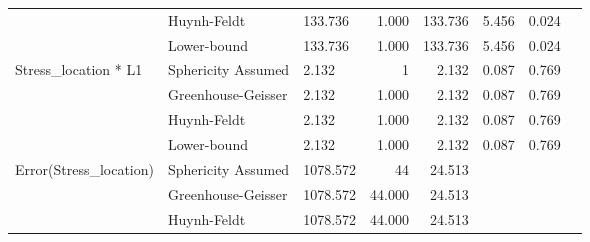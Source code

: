 \documentclass[a4paper]{article}
\begin{document}
\begin{table}[H]
\begin{tabular}{p{}p{}|l|r|r|r|r|r|}
\cline{2-7}
                                                        & Huynh-Feldt        & 133.736                                      & 1.000                   & 133.736                          & 5.456                  & 0.024                      \\ 
\cline{2-7}
                                                        & Lower-bound        & 133.736                                      & 1.000                   & 133.736                          & 5.456                  & 0.024                      \\ 
\hline
\multirow{4}{*}{Stress\_location * L1}                  & Sphericity Assumed & 2.132                                        & 1                       & 2.132                            & 0.087                  & 0.769                      \\ 
\cline{2-7}
                                                        & Greenhouse-Geisser & 2.132                                        & 1.000                   & 2.132                            & 0.087                  & 0.769                      \\ 
\cline{2-7}
                                                        & Huynh-Feldt        & 2.132                                        & 1.000                   & 2.132                            & 0.087                  & 0.769                      \\ 
\cline{2-7}
                                                        & Lower-bound        & 2.132                                        & 1.000                   & 2.132                            & 0.087                  & 0.769                      \\ 
\hline
\multirow{4}{*}{Error(Stress\_location)}                & Sphericity Assumed & 1078.572                                     & 44                      & 24.513                           & \multicolumn{1}{l|}{~} & \multicolumn{1}{l|}{~}     \\ 
\cline{2-7}
                                                        & Greenhouse-Geisser & 1078.572                                     & 44.000                  & 24.513                           & \multicolumn{1}{l|}{~} & \multicolumn{1}{l|}{~}     \\ 
\cline{2-7}
                                                        & Huynh-Feldt        & 1078.572                                     & 44.000                  & 24.513                           & \multicolumn{1}{l|}{~} & \multicolumn{1}{l|}{~}     \\ 

\end{tabular}
\end{table}
\end{document}
